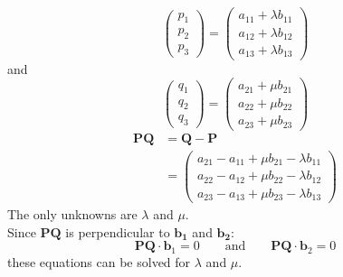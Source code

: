 \documentclass[12pt]{article}
\begin{document}
\noindent
\begin{equation}
\begin{pmatrix}
	p_{1} \\
	p_{2} \\
	p_{3}
\end{pmatrix}
	=
\begin{pmatrix}
	a_{11} + \lambda b_{11} \\
	a_{12} + \lambda b_{12} \\
	a_{13} + \lambda b_{13}
\end{pmatrix}
\end{equation}
	and
\begin{equation}
\begin{pmatrix}
	q_{1} \\
	q_{2} \\
	q_{3}
\end{pmatrix}
	=
\begin{pmatrix}
	a_{21} + \mu b_{21} \\
	a_{22} + \mu b_{22} \\
	a_{23} + \mu b_{23}
\end{pmatrix}
\end{equation}
\begin{align}
	\mathbf{PQ} &= \mathbf{Q} - \mathbf{P} 	\nonumber \\
		&=
\begin{pmatrix}
	a_{21} - a_{11} + \mu b_{21} - \lambda b_{11} \\
	a_{22} - a_{12} + \mu b_{22} - \lambda b_{12} \\
	a_{23} - a_{13} + \mu b_{23} - \lambda b_{13}
\end{pmatrix}
\end{align}
The only unknowns are $\lambda$ and $\mu$. \\

\noindent
Since $\mathbf{PQ}$ is perpendicular to $\mathbf{b_1}$ and $\mathbf{b_2}$:
\begin{equation}
	\mathbf{PQ} \cdot \mathbf{b}_1 = 0 \qquad \text{and} \qquad
	\mathbf{PQ} \cdot \mathbf{b}_2 = 0
\end{equation}
these equations can be solved for $\lambda$ and $\mu$.
\end{document}
